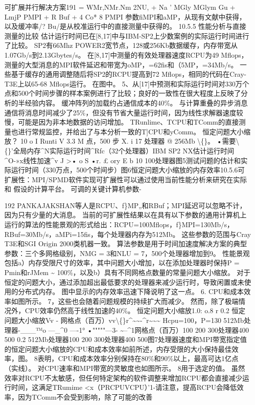 \documentclass[UTF8,11pt,a4paper,openany,fontset=fandol]{ctexbook}
\begin{document}
可扩展并行解决方案191 = WMr,NMr.Nm 2NU, + Na ' MGly MGlym Gu + LmjP PMPI + R Buf + 4 Co* 8 PMPI 参数fiMPI和aMP，从现有文献中获得，以及缓冲率/? Bu/是从校准运行中的直接测量中获得的。 10.5.5 性能分析与直接测量的比较 估计运行时间已在[8,17]中与IBM-SP2上少数案例的实际运行时间进行了比较。 SP2有66Mhz POWER2宽节点，128或256Kb数据缓存，内存带宽从1.07Gb/s到2.13Gbytes/s。 在[8,17]中测量的有效处理器速度RCPU为49 Mflops，测量的大型消息的MPI软件延迟和带宽为oMP，=62fis和（5MP，=34Mb/s。 一些基于缓存的通用调整随后将SP2的RCPU提高到72 Mflops，相同的代码在Cray-T3E上以65-68 Mflops运行。 在图中。 5、从[17]中预测和实际运行时间对330万个点和500个时间步骤的样本案例进行了比较；良好的一致性在很大程度上反映了分析的半经验内容。 缓冲阵列的加载约占通信成本的40\%。 与计算重叠的异步消息通信将消息时间减少了25\%，但没有节省大量运行时间，因为线性求解器速度较慢，可能是因为非本地数据的访问增加。 TRunlime、TCPU和TComm的直接测量也进行常规监控，并给出了与本分析一致的T]CPU和yComm。 恒定问题大小缩放？ 10 o I Runti V 3.3 M 点，500 步 X. i 17 处理器 @ 256Mb \textbackslash\{\}。 •需要\textbackslash\{\}'全局内存\textasciicircum{}N实际运行时间\textasciicircum{}Rfc（32个处理器）IBM SP2 NX估计运行时间\textasciicircum{}O-»x线性加速\textasciicircum{}v J >• o S •r. £ ory E b 10 100处理器图5测试问题的估计和实际运行时间（330万点，500个时间步）图6恒定问题大小缩放的内存效率10.5.6可扩展性：MPI/SPMD软件实现可扩展性可以通过使用当前性能分析来研究在实际和 假设的计算平台。 可调的关键计算机参数-

192 PANKAJAKSHAN等人是RCPU、f\}MP„和RBuf；MPI延迟可以忽略不计，因为只有少量的大消息。 当前的可扩展性结果以在具有以下参数的通用计算机上运行的算法的性能景观的形式给出：RCPU=100Mflops，f\}MPI=130Mb/s，RBuf=30Mb/s，aMPi=15fis，每个处理器内存为512Mb。 这些参数的范围与Cray T3E和SGI Origin 2000类机器一致。 算法参数是用于时间加速度解决方案的典型参数：三个多网格级别，NMG = 3和NLU = 7，500个处理器增加到9。 性能景观包括a）内存受限尺寸的效率，其中问题大小增加，以在添加处理器时保持P = Pmin和rJMem \textasciitilde{} 100\%，以及b）具有不同网格点数量的常量问题大小缩放。 对于恒定的问题大小，通过添加超出最低要求的处理器来减少运行时，导致闲置或未使用的分布式内存。 图中显示的内存效率迅速下降说明了这一点。 6. CPU和成本效率如图所示。 7，这些也会随着问题规模的持续扩大而减少。 然而，除了极端情况外，CPU效率仍然高于线性加速的40\%。 恒定问题大小缩放1.0: o.8 r 0.2 恒定问题大小缩放Vv - 网格点（百万）vv\textbackslash\{\}r\textasciicircum{}\textasciitilde{}\textasciitilde{}-\textasciicircum{}r\textasciitilde{}\textasciitilde{}\textasciitilde{} Hcpu=100，P=130 512Mb处理器-\_\_\_™o ---\_\textasciicircum{}0 ----1° •"""""---3- \textasciitilde{}--\textasciicircum{}1网格点（百万）100 200 300处理器400 500 0.2 512Mb处理器100 200 300处理器400 500图7处理器速度和MPI带宽指定值的恒定问题大小缩放的CPU和成本效率如前所述，内存受限的大小保持最佳效率，图。 8表明，CPU和成本效率分别保持在80\%和90\%以上，最高可达1亿点（实线）。 对CPU速率和MPI带宽的灵敏度也如图所示。 8用于选定的值。 虽然效率对RCPU不太敏感，但任何特定架构的软件调整来增加RCPU都会直接减少运行时间，这满足TRumime <x（PRCPUVCPU）'1-请注意，提高RCPU会降低效率，因为TComm不会受到影响，除了可能的改善
\end{document}

